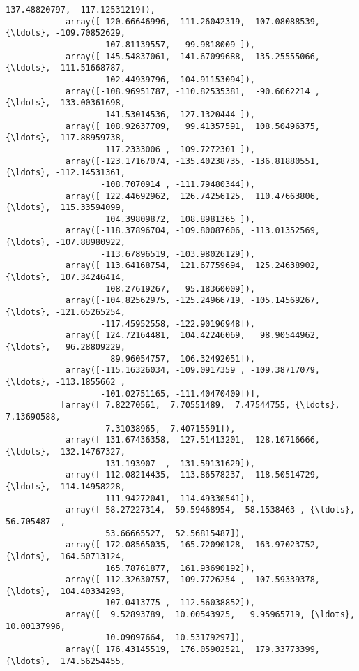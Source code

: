 \documentclass[11pt]{article}
\begin{document}
\begin{Verbatim}[commandchars=\\\{\}]
                    137.48820797,  117.12531219]),
            array([-120.66646996, -111.26042319, -107.08088539, {\ldots}, -109.70852629,
                   -107.81139557,  -99.9818009 ]),
            array([ 145.54837061,  141.67099688,  135.25555066, {\ldots},  111.51668787,
                    102.44939796,  104.91153094]),
            array([-108.96951787, -110.82535381,  -90.6062214 , {\ldots}, -133.00361698,
                   -141.53014536, -127.1320444 ]),
            array([ 108.92637709,   99.41357591,  108.50496375, {\ldots},  117.88959738,
                    117.2333006 ,  109.7272301 ]),
            array([-123.17167074, -135.40238735, -136.81880551, {\ldots}, -112.14531361,
                   -108.7070914 , -111.79480344]),
            array([ 122.44692962,  126.74256125,  110.47663806, {\ldots},  115.33594099,
                    104.39809872,  108.8981365 ]),
            array([-118.37896704, -109.80087606, -113.01352569, {\ldots}, -107.88980922,
                   -113.67896519, -103.98026129]),
            array([ 113.64168754,  121.67759694,  125.24638902, {\ldots},  107.34246414,
                    108.27619267,   95.18360009]),
            array([-104.82562975, -125.24966719, -105.14569267, {\ldots}, -121.65265254,
                   -117.45952558, -122.90196948]),
            array([ 124.72164481,  104.42246069,   98.90544962, {\ldots},   96.28809229,
                     89.96054757,  106.32492051]),
            array([-115.16326034, -109.0917359 , -109.38717079, {\ldots}, -113.1855662 ,
                   -101.02751165, -111.40470409])],
           [array([ 7.82270561,  7.70551489,  7.47544755, {\ldots},  7.13690588,
                    7.31038965,  7.40715591]),
            array([ 131.67436358,  127.51413201,  128.10716666, {\ldots},  132.14767327,
                    131.193907  ,  131.59131629]),
            array([ 112.08214435,  113.86578237,  118.50514729, {\ldots},  114.14958228,
                    111.94272041,  114.49330541]),
            array([ 58.27227314,  59.59468954,  58.1538463 , {\ldots},  56.705487  ,
                    53.66665527,  52.56815487]),
            array([ 172.08565035,  165.72090128,  163.97023752, {\ldots},  164.50713124,
                    165.78761877,  161.93690192]),
            array([ 112.32630757,  109.7726254 ,  107.59339378, {\ldots},  104.40334293,
                    107.0413775 ,  112.56038852]),
            array([  9.52893789,  10.00543925,   9.95965719, {\ldots},  10.00137996,
                    10.09097664,  10.53179297]),
            array([ 176.43145519,  176.05902521,  179.33773399, {\ldots},  174.56254455,

\end{Verbatim}
\end{document}
